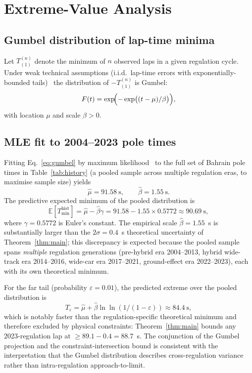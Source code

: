 \documentclass[11pt,twocolumn]{article}
\theoremstyle{definition}
\theoremstyle{remark}
\begin{document}
\section{Extreme-Value Analysis}
\label{sec:extreme}

\subsection{Gumbel distribution of lap-time minima}

Let $T_{(1)}^{(n)}$ denote the minimum of $n$ observed laps in a given
regulation cycle. Under weak technical assumptions
(i.i.d.\ lap-time errors with exponentially-bounded
tails)~\cite{gumbel1958,fisher1928,coles2001,dehaan2006,embrechts1997} the
distribution of $-T_{(1)}^{(n)}$ is Gumbel:
\begin{equation}
  F(t) = \exp\!\Bigl( -\exp\bigl( (t - \mu)/\beta \bigr) \Bigr),
  \label{eq:gumbel}
\end{equation}
with location $\mu$ and scale $\beta > 0$.

\subsection{MLE fit to 2004--2023 pole times}

Fitting Eq.~\eqref{eq:gumbel} by maximum likelihood~\cite{kay1993,wasserman2004,cramer1946}
to the full set of Bahrain pole times in Table~\ref{tab:history} (a pooled sample across
multiple regulation eras, to maximise sample size) yields
\[
  \hat\mu = 91.58~\mathrm{s},\qquad \hat\beta = 1.55~\mathrm{s}.
\]
The predictive expected minimum of the pooled distribution is
\begin{equation}
  \mathbb{E}[T_{\min}^{\mathrm{hist}}] = \hat\mu - \hat\beta \gamma
  = 91.58 - 1.55 \times 0.5772 \approx 90.69~\mathrm{s},
\end{equation}
where $\gamma = 0.5772$ is Euler's constant. The empirical scale
$\hat\beta = 1.55$~s is substantially larger than the
$2\sigma = 0.4$~s theoretical uncertainty of Theorem~\ref{thm:main};
this discrepancy is expected because the pooled sample spans \emph{multiple}
regulation generations (pre-hybrid era 2004--2013, hybrid wide-track era
2014--2016, wide-car era 2017--2021, ground-effect era 2022--2023), each
with its own theoretical minimum.

For the far tail (probability $\varepsilon = 0.01$), the predicted extreme
over the pooled distribution is
\begin{equation}
  T_\varepsilon = \hat\mu + \hat\beta \ln\!\ln(1/(1-\varepsilon))
  \approx 84.4~\mathrm{s},
\end{equation}
which is notably faster than the regulation-specific
theoretical minimum and therefore excluded by physical constraints:
Theorem~\ref{thm:main} bounds any 2023-regulation lap at
$\ge 89.1 - 0.4 = 88.7$~s. The conjunction of the Gumbel projection and
the constraint-intersection bound is consistent with the interpretation that
the Gumbel distribution describes cross-regulation variance rather than
intra-regulation approach-to-limit.
\end{document}
